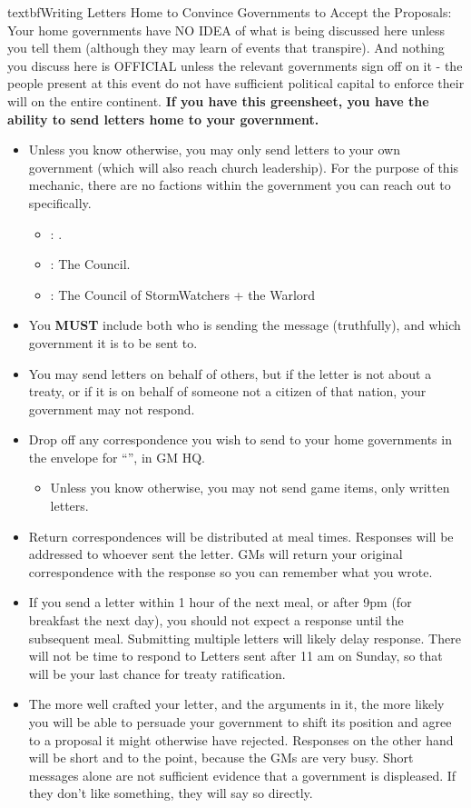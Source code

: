 \documentclass[green]{GL2020}
\begin{document}
textbf{Writing Letters Home to Convince Governments to Accept the Proposals:}
Your home governments have NO IDEA of what is being discussed here unless you tell them (although they may learn of events that transpire). And nothing you discuss here is OFFICIAL unless the relevant governments sign off on it - the people present at this event do not have sufficient political capital to enforce their will on the entire continent. \textbf{If you have this greensheet, you have the ability to send letters home to your government.}
\begin{itemize}
  \item Unless you know otherwise, you may only send letters to your own government (which will also reach church leadership). For the purpose of this mechanic, there are no factions within the government you can reach out to specifically.
  \begin{itemize}
    \item \pFarm{}: \cQueen{\full}.
    \item \pTech{}: The Council.
    \item \pShip{}: The Council of StormWatchers + the Warlord
  \end{itemize}
  \item You \textbf{MUST} include both who is sending the message (truthfully), and which government it is to be sent to.
  \item You may send letters on behalf of others, but if the letter is not about a treaty, or if it is on behalf of someone not a citizen of that nation, your government may not respond.
  \item Drop off any correspondence you wish to send to your home governments in the envelope for “\sSignT{}”, in GM HQ.
  \begin{itemize}
    \item Unless you know otherwise, you may not send game items, only written letters.
  \end{itemize}
  \item Return correspondences will be distributed at meal times. Responses will be addressed to whoever sent the letter. GMs will return your original correspondence with the response so you can remember what you wrote.
  \item If you send a letter within 1 hour of the next meal, or after 9pm (for breakfast the next day), you should not expect a response until the subsequent meal. Submitting multiple letters will likely delay response. There will not be time to respond to Letters sent after 11 am on Sunday, so that will be your last chance for treaty ratification.
  \item The more well crafted your letter, and the arguments in it, the more likely you will be able to persuade your government to shift its position and agree to a proposal it might otherwise have rejected. Responses on the other hand will be short and to the point, because the GMs are very busy. Short messages alone are not sufficient evidence that a government is displeased. If they don’t like something, they will say so directly.
\end{itemize}
\end{document}
